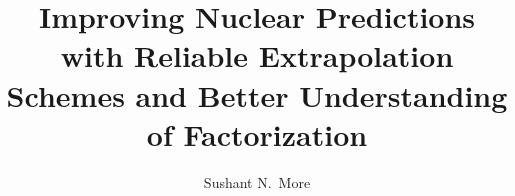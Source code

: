 \documentclass[11pt, phd]{osudissert96}
\title{
	\texorpdfstring{
		Improving Nuclear Predictions with Reliable Extrapolation Schemes and
		Better Understanding of Factorization
	}{
		Improving Nuclear Predictions with Reliable Extrapolation Schemes and
		Better Understanding of Factorization
	}
}
\author{Sushant N.\ More}
\begin{document}
\maketitle
\disscopyright
\clearpage


\dedication{To the memory of my late grandparents, who valued integrity and
 education above everything else.}




\tableofcontents

\clearpage
\listoffigures

\clearpage
\listoftables



\startdoublespace











\appendix



\end{document}

